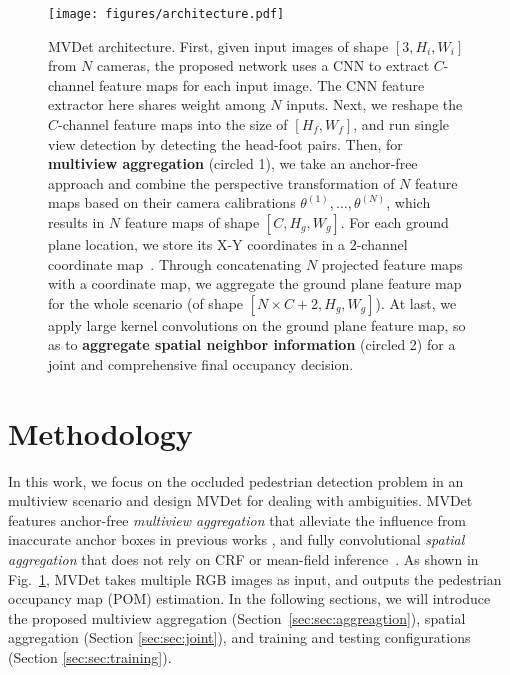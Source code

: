 \documentclass[runningheads]{llncs}
\begin{document}
\begin{figure}[t]
    \centering
    \texttt{[image: figures/architecture.pdf]}
    \caption{MVDet architecture. First, given input images of shape $\left[3,H_i,W_i\right]$ from $N$ cameras, the proposed network uses a CNN to extract $C$-channel feature maps for each input image. The CNN feature extractor here shares weight among $N$ inputs. Next, we reshape the $C$-channel feature maps into the size of $\left[H_f,W_f\right]$, and run single view detection by detecting the head-foot pairs. Then, for \textbf{multiview aggregation} (circled 1), we take an anchor-free approach and combine the perspective transformation of $N$ feature maps based on their camera calibrations $\theta^{\left(1\right)}, \dots, \theta^{\left(N\right)}$, which results in $N$ feature maps of shape $\left[C,H_g,W_g\right]$. For each ground plane location, we store its X-Y coordinates in a $2$-channel coordinate map~\cite{liu2018intriguing}. Through concatenating $N$ projected feature maps with a coordinate map, we aggregate the ground plane feature map for the whole scenario (of shape $\left[N \times C + 2,H_g,W_g\right]$). At last, we apply large kernel convolutions on the ground plane feature map, so as to \textbf{aggregate spatial neighbor information} (circled 2) for a joint and comprehensive final occupancy decision. 
    }
    \label{fig:architecture}
\end{figure}


\section{Methodology}
\label{sec:method}
In this work, we focus on the occluded pedestrian detection problem in an multiview scenario and design MVDet for dealing with ambiguities. 
MVDet features anchor-free \textit{multiview aggregation} that alleviate the influence from inaccurate anchor boxes in previous works \cite{chen2017multi,ku2018joint,chavdarova2017deep,baque2017deep}, and fully convolutional \textit{spatial aggregation} that does not rely on CRF or mean-field inference~\cite{fleuret2007multicamera,roig2011conditional,baque2017deep}. 
As shown in Fig.~\ref{fig:architecture}, MVDet takes multiple RGB images as input, and outputs the pedestrian occupancy map (POM) estimation. In the following sections, we will introduce the proposed multiview aggregation (Section~\ref{sec:sec:aggreagtion}), spatial aggregation  (Section \ref{sec:sec:joint}), and training and testing configurations (Section \ref{sec:sec:training}).
\end{document}

